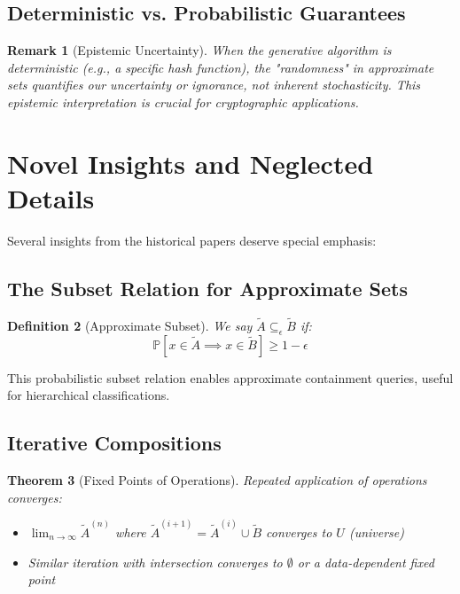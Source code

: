 \documentclass[11pt]{article}
\newtheorem{theorem}{Theorem}[section]
\newtheorem{definition}[theorem]{Definition}
\newtheorem{remark}[theorem]{Remark}
\newcommand{\observed}[1]{\tilde{#1}}  %
\newcommand{\prob}[1]{\mathbb{P}\left[#1\right]}
\newcommand{\union}{\cup}
\begin{document}
\subsection{Deterministic vs. Probabilistic Guarantees}

\begin{remark}[Epistemic Uncertainty]
When the generative algorithm is deterministic (e.g., a specific hash function), the "randomness" in approximate sets quantifies our uncertainty or ignorance, not inherent stochasticity. This epistemic interpretation is crucial for cryptographic applications.
\end{remark}

\section{Novel Insights and Neglected Details}
\label{sec:insights}

Several insights from the historical papers deserve special emphasis:

\subsection{The Subset Relation for Approximate Sets}

\begin{definition}[Approximate Subset]
We say $\observed{A} \subseteq_{\epsilon} \observed{B}$ if:
$$\prob{x \in \observed{A} \implies x \in \observed{B}} \geq 1 - \epsilon$$
\end{definition}

This probabilistic subset relation enables approximate containment queries, useful for hierarchical classifications.

\subsection{Iterative Compositions}

\begin{theorem}[Fixed Points of Operations]
Repeated application of operations converges:
\begin{itemize}
\item $\lim_{n \to \infty} \observed{A}^{(n)}$ where $\observed{A}^{(i+1)} = \observed{A}^{(i)} \union \observed{B}$ converges to $U$ (universe)
\item Similar iteration with intersection converges to $\emptyset$ or a data-dependent fixed point
\end{itemize}
\end{theorem}
\end{document}
